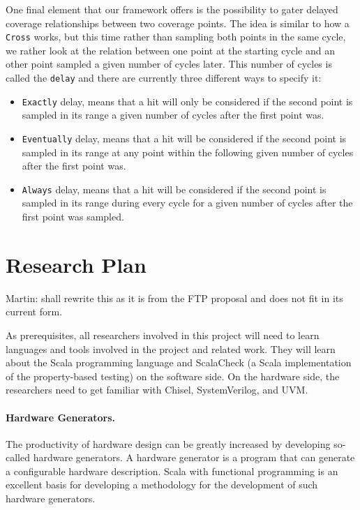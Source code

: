 \documentclass[conference]{IEEEtran}
\newcommand{\martin}[1]{{\color{blue} Martin: #1}}
\begin{document}
One final element that our framework offers is the possibility to gater delayed coverage relationships between two coverage points. The idea is similar to how a \texttt{Cross} works, but this time rather than sampling both points in the same cycle, we rather look at the relation between one point at the starting cycle and an other point sampled a given number of cycles later. This number of cycles is called the \texttt{delay} and there are currently three different ways to specify it:  
\begin{itemize}
 \item \texttt{Exactly} delay, means that a hit will only be considered if the second point is sampled in its range a given number of cycles after the first point was.
 \item \texttt{Eventually} delay, means that a hit will be considered if the second point is sampled in its range at any point within the following given number of cycles after the first point was.  
 \item \texttt{Always} delay, means that a hit will be considered if the second point is sampled in its range during every cycle for a given number of cycles after the first point was sampled.
\end{itemize}


\section{Research Plan}

\martin{shall rewrite this as it is from the FTP proposal and does not
fit in its current form.}


As prerequisites, all researchers involved in this project will need to learn
languages and tools involved in the project and related work.
They will learn about the Scala programming language and ScalaCheck
(a Scala implementation of the property-based testing) on the software side.
On the hardware side,
the researchers need to get familiar with Chisel, SystemVerilog, and
UVM.


\paragraph{Hardware Generators.}

The productivity of hardware design can be greatly increased by developing so-called
hardware generators. A hardware generator is a program that can generate a configurable
hardware description.
Scala with functional programming is an excellent basis for developing a methodology for the
development of such hardware generators.
\end{document}
